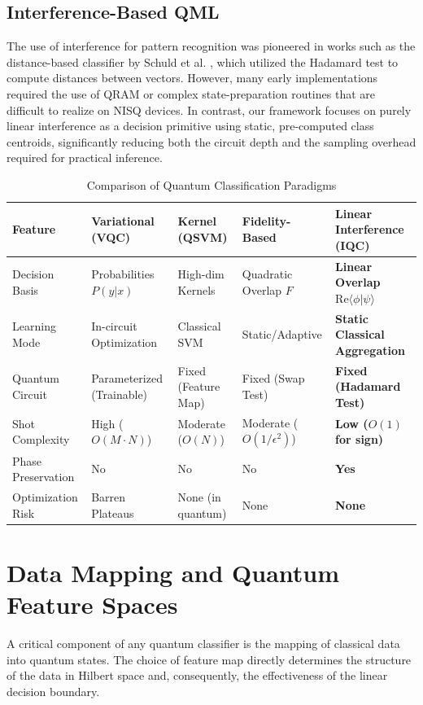 \documentclass[conference]{IEEEtran}
\begin{document}
\subsection{Interference-Based QML}

The use of interference for pattern recognition was pioneered in works such as the distance-based classifier by Schuld et al. \cite{schuld2017distance,schuld2018book}, which utilized the Hadamard test to compute distances between vectors. However, many early implementations required the use of QRAM or complex state-preparation routines that are difficult to realize on NISQ devices. In contrast, our framework focuses on purely linear interference as a decision primitive using static, pre-computed class centroids, significantly reducing both the circuit depth and the sampling overhead required for practical inference.

\begin{table}[t]
\centering
\caption{Comparison of Quantum Classification Paradigms}
\label{tab:comparison}
\begin{tabular}{@{}lllll@{}}
\toprule
Feature & Variational (VQC) & Kernel (QSVM) & Fidelity-Based & \textbf{Linear Interference (IQC)} \\ \midrule
Decision Basis & Probabilities $P(y|x)$ & High-dim Kernels & Quadratic Overlap $F$ & \textbf{Linear Overlap $\text{Re}\langle \phi|\psi \rangle$} \\
Learning Mode & In-circuit Optimization & Classical SVM & Static/Adaptive & \textbf{Static Classical Aggregation} \\
Quantum Circuit & Parameterized (Trainable) & Fixed (Feature Map) & Fixed (Swap Test) & \textbf{Fixed (Hadamard Test)} \\
Shot Complexity & High ($O(M \cdot N)$) & Moderate ($O(N)$) & Moderate ($O(1/\epsilon^2)$) & \textbf{Low ($O(1)$ for sign)} \\
Phase Preservation & No & No & No & \textbf{Yes} \\
Optimization Risk & Barren Plateaus & None (in quantum) & None & \textbf{None} \\ \bottomrule
\end{tabular}
\end{table}

\section{Data Mapping and Quantum Feature Spaces}

A critical component of any quantum classifier is the mapping of classical data into quantum states. The choice of feature map directly determines the structure of the data in Hilbert space and, consequently, the effectiveness of the linear decision boundary.
\end{document}
